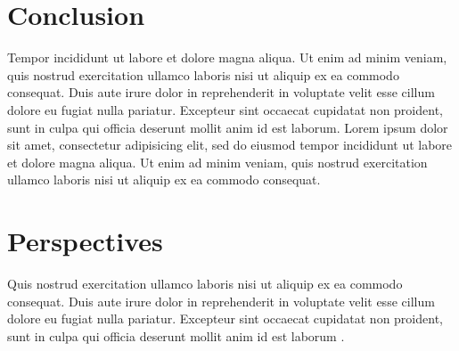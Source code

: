 \documentclass[a0, portrait]{a0poster}
\begin{document}
\begin{multicols}{3}
\color{SaddleBrown} %

\section*{Conclusion}

Tempor incididunt ut labore et dolore magna aliqua. Ut enim ad minim veniam,
quis nostrud exercitation ullamco laboris nisi ut aliquip ex ea commodo
consequat. Duis aute irure dolor in reprehenderit in voluptate velit esse
cillum dolore eu fugiat nulla pariatur. Excepteur sint occaecat cupidatat non
proident, sunt in culpa qui officia deserunt mollit anim id est laborum. Lorem ipsum dolor sit amet, consectetur adipisicing elit, sed do eiusmod
tempor incididunt ut labore et dolore magna aliqua. Ut enim ad minim veniam,
quis nostrud exercitation ullamco laboris nisi ut aliquip ex ea commodo
consequat.

\color{Black} %


\section*{Perspectives}

Quis nostrud exercitation ullamco laboris nisi ut aliquip ex ea commodo
consequat. Duis aute irure dolor in reprehenderit in voluptate velit esse
cillum dolore eu fugiat nulla pariatur. Excepteur sint occaecat cupidatat non
proident, sunt in culpa qui officia deserunt mollit anim id est laborum \cite{schaeffer99}.





\end{multicols}
\end{document}
